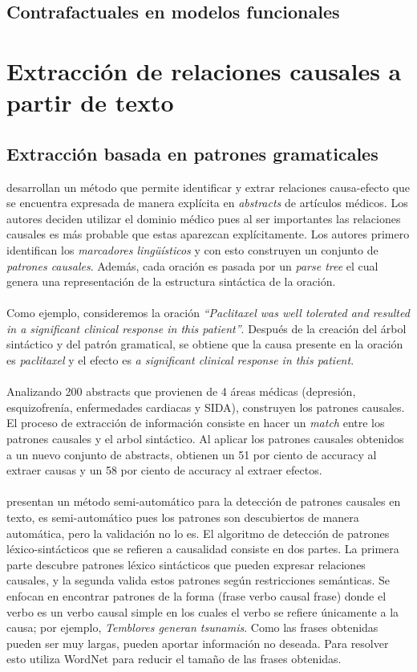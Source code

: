 \documentclass[11pt]{article}
\theoremstyle{plain}
\begin{document}
\subsection{Contrafactuales en modelos funcionales}

\section{Extracción de relaciones causales a partir de texto}
\subsection{Extracción basada en patrones gramaticales}
\cite{khoo2000extracting} desarrollan un método que permite identificar y extrar relaciones causa-efecto que se encuentra expresada de manera explícita en \textit{abstracts} de artículos médicos. Los autores deciden utilizar el dominio médico pues al ser importantes las relaciones causales es más probable que estas aparezcan explícitamente. Los autores primero identifican los \textit{marcadores lingüísticos} y con esto construyen un conjunto de \textit{patrones causales}. Además, cada oración es pasada por un \textit{parse tree} el cual genera una representación de la estructura sintáctica de la oración.\\
\\
Como ejemplo, consideremos la oración \textit{“Paclitaxel was well tolerated and resulted in a significant clinical response in this patient”}. Después de la creación del árbol sintáctico y del patrón gramatical, se obtiene que la causa presente en la oración es \textit{paclitaxel} y el efecto es \textit{a significant clinical response in this patient}.\\
\\
Analizando 200 abstracts que provienen de 4 áreas médicas (depresión, esquizofrenía, enfermedades cardiacas y SIDA), construyen los patrones causales. El proceso de extracción de información consiste en hacer un \textit{match} entre los patrones causales y el arbol sintáctico. Al aplicar los patrones causales obtenidos a un nuevo conjunto de abstracts, obtienen un 51 por ciento de accuracy al extraer causas y un 58 por ciento de accuracy al extraer efectos.\\
\\
\cite{girju2002text} presentan un método semi-automático para la detección de patrones causales en texto, es semi-automático pues los patrones son descubiertos de manera automática, pero la validación no lo es. El algoritmo de detección de patrones léxico-sintácticos que  se refieren a causalidad consiste en dos partes. La primera parte descubre patrones léxico sintácticos que pueden expresar relaciones causales, y la segunda valida estos patrones según restricciones semánticas. Se enfocan en encontrar patrones de la forma (frase verbo causal frase) donde el verbo es un verbo causal simple en los cuales el verbo se refiere únicamente a la causa; por ejemplo, \textit{Temblores generan tsunamis}. Como las frases obtenidas pueden ser muy largas, pueden aportar información no deseada. Para resolver esto \cite{girju2003automatic} utiliza WordNet para reducir el tamaño de las frases obtenidas.\\
\end{document}
